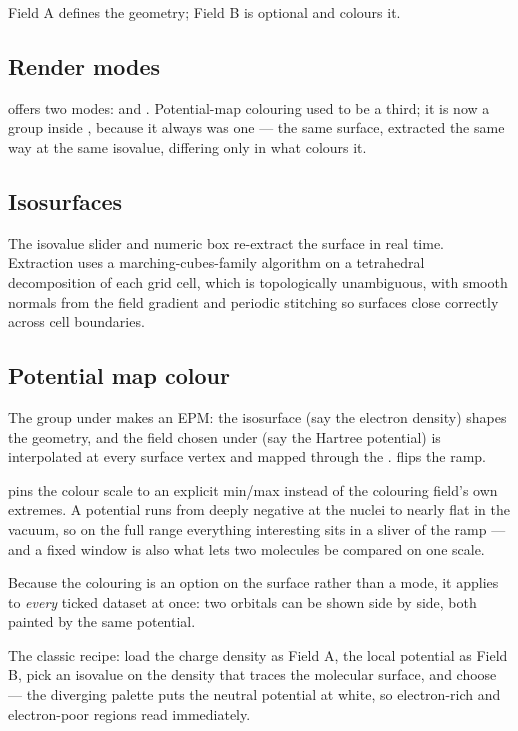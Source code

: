 Field A defines the geometry; Field B is optional and colours it.

\subsection{Render modes}

 offers two modes:  and . Potential-map colouring used to be a third; it is now a group inside
, because it always was one --- the same surface, extracted the
same way at the same isovalue, differing only in what colours it.

\subsection{Isosurfaces}

The isovalue slider and numeric box re-extract the surface in real time.
Extraction uses a marching-cubes-family algorithm on a tetrahedral
decomposition of each grid cell, which is topologically unambiguous, with
smooth normals from the field gradient and periodic stitching so surfaces
close correctly across cell boundaries.

\subsection{Potential map colour}

The  group under  makes an EPM: the
isosurface (say the electron density) shapes the geometry, and the field chosen
under  (say the Hartree potential) is interpolated at every
surface vertex and mapped through the . 
flips the ramp.

 pins the colour scale to an explicit min/max instead of the
colouring field's own extremes. A potential runs from deeply negative at the
nuclei to nearly flat in the vacuum, so on the full range everything
interesting sits in a sliver of the ramp --- and a fixed window is also what
lets two molecules be compared on one scale.

Because the colouring is an option on the surface rather than a mode, it
applies to \emph{every} ticked dataset at once: two orbitals can be shown side
by side, both painted by the same potential.

\begin{caltip}
The classic recipe: load the charge density as Field A, the local potential
as Field B, pick an isovalue on the density that traces the molecular
surface, and choose  --- the diverging palette puts the
neutral potential at white, so electron-rich and electron-poor regions read
immediately.
\end{caltip}

